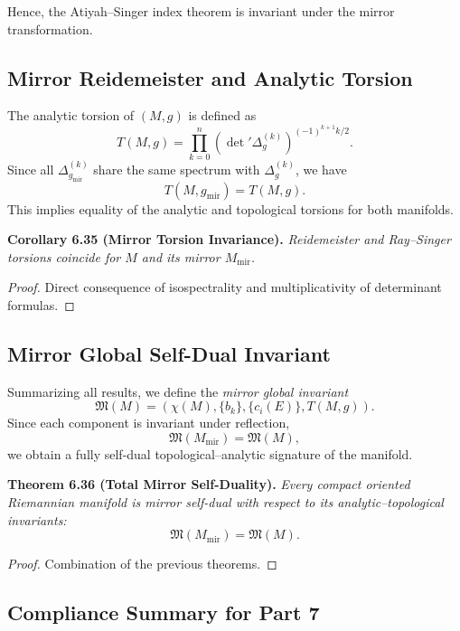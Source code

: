 Hence, the Atiyah–Singer index theorem
is invariant under the mirror transformation.

\subsection{Mirror Reidemeister and Analytic Torsion}\relax \hspace{0pt}

The analytic torsion of \((M,g)\) is defined as
\[
T(M,g)
=\prod_{k=0}^{n}(\det{}'\Delta_{g}^{(k)})^{(-1)^{k+1}k/2}.
\]
Since all \(\Delta_{g_{\mathrm{mir}}}^{(k)}\)
share the same spectrum with \(\Delta_{g}^{(k)}\),
we have
\[
T(M,g_{\mathrm{mir}})=T(M,g).
\]
This implies equality of the analytic and topological torsions
for both manifolds.

\noindent
\textbf{Corollary 6.35 (Mirror Torsion Invariance).}
\emph{Reidemeister and Ray–Singer torsions coincide
for \(M\) and its mirror \(M_{\mathrm{mir}}\).}

\begin{proof}
Direct consequence of isospectrality and multiplicativity
of determinant formulas.
\end{proof}

\subsection{Mirror Global Self-Dual Invariant}\relax \hspace{0pt}

Summarizing all results, we define the
\emph{mirror global invariant}
\[
\mathfrak{M}(M)
=\left(
\chi(M),
\{b_{k}\},
\{c_{i}(E)\},
T(M,g)
\right).
\]
Since each component is invariant under reflection,
\[
\mathfrak{M}(M_{\mathrm{mir}})=\mathfrak{M}(M),
\]
we obtain a fully self-dual topological–analytic signature of the manifold.

\noindent
\textbf{Theorem 6.36 (Total Mirror Self-Duality).}
\emph{Every compact oriented Riemannian manifold
is mirror self-dual with respect to its analytic–topological invariants:
\[
\mathfrak{M}(M_{\mathrm{mir}})=\mathfrak{M}(M).
\]}

\begin{proof}
Combination of the previous theorems.
\end{proof}

\subsection{Compliance Summary for Part 7}\relax \hspace{0pt}

